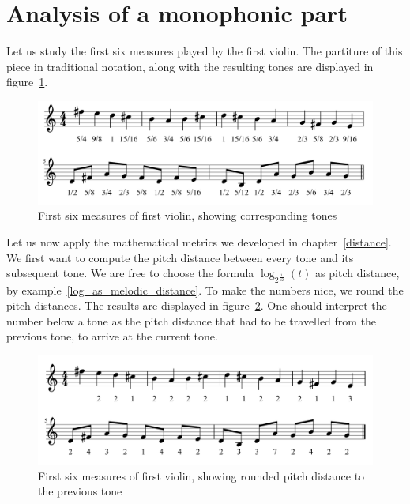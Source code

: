 \documentclass[a4paper]{book}
\theoremstyle{definition}
\begin{document}
\section{Analysis of a monophonic part}
Let us study the first six measures played by the first violin. The partiture of this piece in traditional notation, along with the resulting tones are displayed in figure~\ref{fig_first_violin_tones}.

\begin{figure}[H]
    \centering
    \includegraphics[scale=0.25]{figures/fig_first_violin_tones.png}
    \caption{First six measures of first violin, showing corresponding tones}
    \label{fig_first_violin_tones}
\end{figure}

Let us now apply the mathematical metrics we developed in chapter~\ref{distance}.
We first want to compute the pitch distance between every tone and its subsequent tone.
We are free to choose the formula $\log_{2^{\frac{1}{12}}}(t)$ as pitch distance, by example~\ref{log_as_melodic_distance}.
To make the numbers nice, we round the pitch distances.
The results are displayed in figure~\ref{fig_first_violin_melodic_distance}.
One should interpret the number below a tone as the pitch distance that had to be travelled from the previous tone, to arrive at the current tone.

\begin{figure}[H]
    \centering
    \includegraphics[scale=0.25]{figures/fig_first_violin_melodic_distance.png}
    \caption{First six measures of first violin, showing rounded pitch distance to the previous tone}
    \label{fig_first_violin_melodic_distance}
\end{figure}
\end{document}
